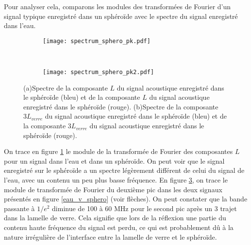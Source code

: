 Pour analyser cela, comparons les modules des transformées de Fourier d'un signal typique enregistré dans un sphéroïde avec le spectre du signal enregistré dans l'eau.
\begin{figure}[ht!]
	\begin{subfigure}{0.5\textwidth}
	\centering
	\texttt{[image: spectrum\_sphero\_pk.pdf]}
	\caption{ \label{spectrum_peaks1}}
	\end{subfigure}
	~~
	\begin{subfigure}{0.5\textwidth}
		\centering
	\texttt{[image: spectrum\_sphero\_pk2.pdf]}
	\caption{ \label{spectrum_peaks2}}
	\end{subfigure}
	\caption{(a)Spectre de la composante $L$ du signal acoustique enregistré dans le sphéroïde (bleu)
	et de la composante $L$ du signal acoustique enregistré dans le sphéroïde (rouge). (b)Spectre de la composante $3L_{verre}$ du signal acoustique enregistré dans le sphéroïde (bleu)
	et de la composante $3L_{verre}$ du signal acoustique enregistré dans le sphéroïde (rouge).}
\end{figure}
On trace en figure \ref{spectrum_peaks1} le module de la transformée de Fourier des composantes $L$ pour un signal dans l'eau et dans un sphéroïde. On peut voir que le signal enregistré sur le sphéroïde a un spectre légèrement différent de celui du signal de l'eau, avec un contenu un peu plus basse fréquence. En figure \ref{spectrum_peaks2}, on trace le module de transformée de Fourier du deuxième pic dans les deux signaux présentés en figure \ref{eau_v_sphero} (voir flèches). On peut constater que la bande passante à  $1/e^2$ diminue de  100 à 60 MHz pour le second pic après un 3 trajet dans la lamelle de verre. Cela signifie que lors de la réflexion une partie du contenu haute fréquence du signal est perdu, ce qui est probablement dû à la nature irrégulière de l'interface entre la lamelle de verre et le sphéroïde.

